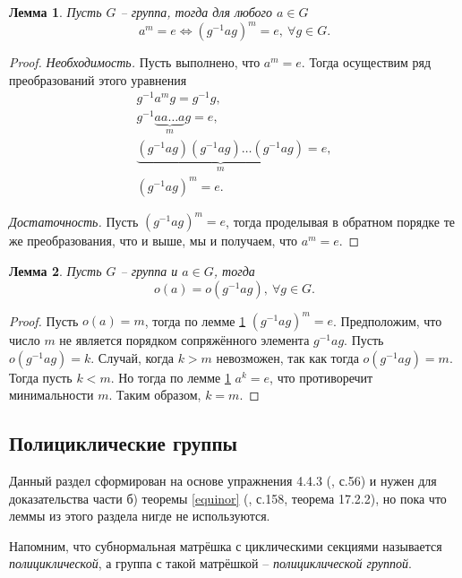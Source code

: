 \documentclass{article}
\newtheorem{lemma}{Лемма}[section]
\begin{document}
\begin{lemma} \label{dqiopnw}
    Пусть $G$ -- группа, тогда для любого $a \in G$
    \[
        a^m = e \Leftrightarrow (g^{-1} a g)^m = e, \ \forall g \in G.
    \]
\end{lemma}
\begin{proof}
    \textit{Необходимость.} Пусть выполнено, что $a^m = e$. Тогда осуществим ряд преобразований этого уравнения
    \begin{gather*}
        g^{-1} a^m g = g^{-1} g, \\
        g^{-1} \underbrace{a a \ldots a}_{m} g = e, \\
        \underbrace{(g^{-1} a g) (g^{-1} a g) \ldots (g^{-1} a g)}_{m} = e, \\
        (g^{-1} a g)^m = e.
    \end{gather*}

    \textit{Достаточность.} Пусть $(g^{-1} a g)^m = e$, тогда проделывая в обратном порядке те же преобразования, что и выше, мы и получаем, что $a^m = e$.
\end{proof}

\begin{lemma} \label{fenjoi}
    Пусть $G$ -- группа и $a \in G$, тогда
    \[
        o(a) = o(g^{-1} a g), \ \forall g \in G.
    \]
\end{lemma}
\begin{proof}
    Пусть $o(a) = m$, тогда по лемме \ref{dqiopnw} $(g^{-1} a g)^m = e$. Предположим, что число $m$ не является порядком сопряжённого элемента $g^{-1} a g$. Пусть $o(g^{-1} a g) = k$. Случай, когда $k > m$ невозможен, так как тогда $o(g^{-1} a g) = m$. Тогда пусть $k < m$. Но тогда по лемме \ref{dqiopnw} $a^k = e$, что противоречит минимальности $m$. Таким образом, $k = m$.
\end{proof}

\subsection{Полициклические группы}

Данный раздел сформирован на основе упражнения 4.4.3 (\cite{kargapolov}, с.56) и нужен для доказательства части б) теоремы \ref{equinor} (\cite{kargapolov}, с.158, теорема 17.2.2), но пока что леммы из этого раздела нигде не используются.

Напомним, что субнормальная матрёшка с циклическими секциями называется \textit{полициклической}, а группа с такой матрёшкой -- \textit{полициклической группой}.
\end{document}
